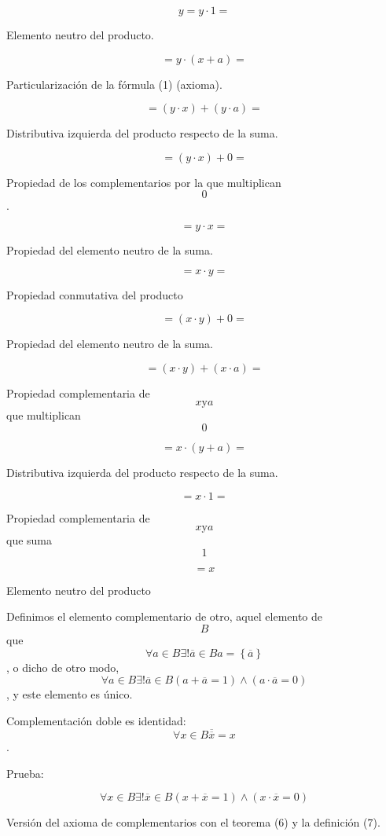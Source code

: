 \[y{{= {y \cdot 1}} =}\]

Elemento neutro del producto.

\[{= {y \cdot {({x + a})}}} =\]

Particularización de la fórmula (1) (axioma).

\[{= {{({y \cdot x})} + {({y \cdot a})}}} =\]

Distributiva izquierda del producto respecto de la suma.

\[{= {{({y \cdot x})} + 0}} =\]

Propiedad de los complementarios por la que multiplican \[0\].

\[{= {y \cdot x}} =\]

Propiedad del elemento neutro de la suma.

\[{= {x \cdot y}} =\]

Propiedad conmutativa del producto

\[{= {{({x \cdot y})} + 0}} =\]

Propiedad del elemento neutro de la suma.

\[{= {{({x \cdot y})} + {({x \cdot a})}}} =\]

Propiedad complementaria de \[x\text{y}a\]que multiplican \[0\]

\[{= {x \cdot {({y + a})}}} =\]

Distributiva izquierda del producto respecto de la suma.

\[{= {x \cdot 1}} =\]

Propiedad complementaria de \[x\text{y}a\]que suma \[1\]

\[= x\]

Elemento neutro del producto

Definimos el elemento complementario de otro, aquel elemento de \[B\]
que
\[\forall{a \in B}\exists!{\overline{a} \in B}{\widehat{a} = \left\{ \overline{a} \right\}}\],
o dicho de otro modo,
\[\forall{a \in B}\exists!{\overline{a} \in B}{\left( {{a + \overline{a}} = 1} \right) \land \left( {{a \cdot \overline{a}} = 0} \right)}\],
y este elemento es único.

Complementación doble es identidad:
\[\forall{x \in B}{\overline{\overline{x}} = x}\].

Prueba:

\[\forall{x \in B}{}{}{}\exists\mathtt{\mathrm{!}}{\overline{x} \in B}{}{}{}{\left( {{x + \overline{x}} = 1} \right) \land \left( {{x \cdot \overline{x}} = 0} \right)}\]

Versión del axioma de complementarios con el teorema (6) y la definición
(7).


